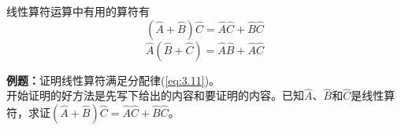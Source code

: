 	线性算符运算中有用的算符有
	\begin{equation}
		\boxed{
			\left(\hat{A}+\hat{B}\right)\hat{C} = \hat{A}\hat{C}+\hat{B}\hat{C}
		}
		\label{eq:3.11}
	\end{equation}
	\begin{equation}
		\boxed{
			\hat{A}\left(\hat{B}+\hat{C}\right) = \hat{A}\hat{B}+\hat{A}\hat{C}
		}
		\label{eq:3.12}
	\end{equation}
	\begin{examplebox}
		\textbf{例题：}证明线性算符满足分配律(\ref{eq:3.11})。\\
		
		开始证明的好方法是先写下给出的内容和要证明的内容。已知$\hat{A}$、$\hat{B}$和$\hat{C}$是线性算符，求证$\left(\hat{A}+\hat{B}\right)\hat{C} = \hat{A}\hat{C}+\hat{B}\hat{C}$。


\end{examplebox}
